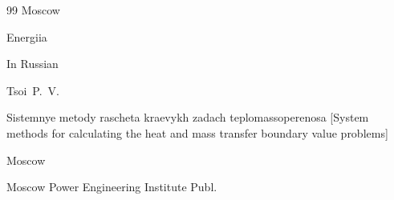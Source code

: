 \begin{thebibliography}{99}
\publaddr Moscow

\publ Energiia








\lang In Russian

\by Tsoi~P.~V.

\book Sistemnye metody rascheta kraevykh zadach teplomassoperenosa \rm [System methods for calculating the heat and mass transfer boundary value problems]

\publaddr  Moscow

\publ Moscow Power Engineering Institute Publ.







\end{thebibliography}



\EngDate



\newpage

\Russian



%

% 